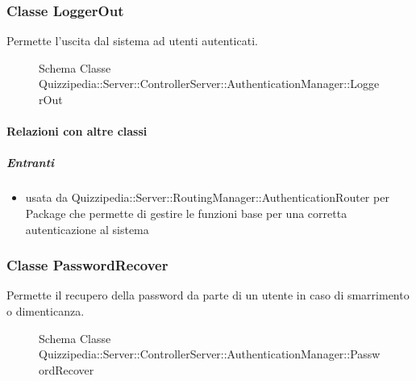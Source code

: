 \subsubsection{Classe LoggerOut}
Permette l'uscita dal sistema ad utenti autenticati.
\begin{figure}[H]
\centering
\noindent{}
\caption[Schema Classe LoggerOut]{Schema Classe Quizzipedia::Server::ControllerServer::AuthenticationManager::LoggerOut}
\end{figure}
\paragraph{Relazioni con altre classi}
\subparagraph{Entranti}
\begin{itemize}
\item usata da Quizzipedia::Server::RoutingManager::AuthenticationRouter per Package che permette di gestire le funzioni base per una corretta autenticazione al sistema
\end{itemize}
\subsubsection{Classe PasswordRecover}
Permette il recupero della password da parte di un utente in caso di smarrimento o dimenticanza.
\begin{figure}[H]
\centering
\noindent{}
\caption[Schema Classe PasswordRecover]{Schema Classe Quizzipedia::Server::ControllerServer::AuthenticationManager::PasswordRecover}
\end{figure}
